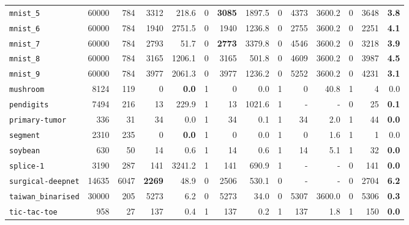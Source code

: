 \begin{tabular}{lccrrrrrrrrrrr}
\texttt{mnist\_5} & \multicolumn{1}{r}{60000} & \multicolumn{1}{r}{784}  & 3312 & 218.6 & 0 & \textbf{3085} & 1897.5 & 0 & 4373 & 3600.2 & 0 & 3648 & \textbf{3.8}\\
\texttt{mnist\_6} & \multicolumn{1}{r}{60000} & \multicolumn{1}{r}{784}  & 1940 & 2751.5 & 0 & 1940 & 1236.8 & 0 & 2755 & 3600.2 & 0 & 2251 & \textbf{4.1}\\
\texttt{mnist\_7} & \multicolumn{1}{r}{60000} & \multicolumn{1}{r}{784}  & 2793 & 51.7 & 0 & \textbf{2773} & 3379.8 & 0 & 4546 & 3600.2 & 0 & 3218 & \textbf{3.9}\\
\texttt{mnist\_8} & \multicolumn{1}{r}{60000} & \multicolumn{1}{r}{784}  & 3165 & 1206.1 & 0 & 3165 & 501.8 & 0 & 4609 & 3600.2 & 0 & 3987 & \textbf{4.5}\\
\texttt{mnist\_9} & \multicolumn{1}{r}{60000} & \multicolumn{1}{r}{784}  & 3977 & 2061.3 & 0 & 3977 & 1236.2 & 0 & 5252 & 3600.2 & 0 & 4231 & \textbf{3.1}\\
\texttt{mushroom} & \multicolumn{1}{r}{8124} & \multicolumn{1}{r}{119}  & 0 & \textbf{0.0} & 1 & 0 & 0.0 & 1 & 0 & 40.8 & 1 & 4 & 0.0\\
\texttt{pendigits} & \multicolumn{1}{r}{7494} & \multicolumn{1}{r}{216}  & 13 & 229.9 & 1 & 13 & 1021.6 & 1 & - & - & 0 & 25 & \textbf{0.1}\\
\texttt{primary-tumor} & \multicolumn{1}{r}{336} & \multicolumn{1}{r}{31}  & 34 & 0.0 & 1 & 34 & 0.1 & 1 & 34 & 2.0 & 1 & 44 & \textbf{0.0}\\
\texttt{segment} & \multicolumn{1}{r}{2310} & \multicolumn{1}{r}{235}  & 0 & \textbf{0.0} & 1 & 0 & 0.0 & 1 & 0 & 1.6 & 1 & 1 & 0.0\\
\texttt{soybean} & \multicolumn{1}{r}{630} & \multicolumn{1}{r}{50}  & 14 & 0.6 & 1 & 14 & 0.6 & 1 & 14 & 5.1 & 1 & 32 & \textbf{0.0}\\
\texttt{splice-1} & \multicolumn{1}{r}{3190} & \multicolumn{1}{r}{287}  & 141 & 3241.2 & 1 & 141 & 690.9 & 1 & - & - & 0 & 141 & \textbf{0.0}\\
\texttt{surgical-deepnet} & \multicolumn{1}{r}{14635} & \multicolumn{1}{r}{6047}  & \textbf{2269} & 48.9 & 0 & 2506 & 530.1 & 0 & - & - & 0 & 2704 & \textbf{6.2}\\
\texttt{taiwan\_binarised} & \multicolumn{1}{r}{30000} & \multicolumn{1}{r}{205}  & 5273 & 6.2 & 0 & 5273 & 34.0 & 0 & 5307 & 3600.0 & 0 & 5306 & \textbf{0.3}\\
\texttt{tic-tac-toe} & \multicolumn{1}{r}{958} & \multicolumn{1}{r}{27}  & 137 & 0.4 & 1 & 137 & 0.2 & 1 & 137 & 1.8 & 1 & 150 & \textbf{0.0}\\

\end{tabular}
